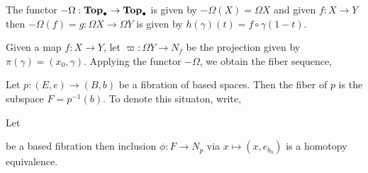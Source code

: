 \documentclass[12pt]{extarticle}
\begin{document}
\begin{definition}
The functor $-\Omega : \mathbf{Top}_{\bullet} \to \mathbf{Top}_{\bullet}$ is given by $-\Omega (X) = \Omega X$ and given $f : X \to Y$ then $- \Omega (f) = g : \Omega X \to \Omega Y$ is given by $h(\gamma)(t) = f \circ \gamma(1 - t)$.  
\end{definition}

\begin{definition}
Given a map $f : X \to Y$, let $\varpi : \Omega Y \to N_f$ be the projection given by $\pi(\gamma) = (x_0, \gamma)$. Applying the functor $-\Omega$, we obtain the fiber sequence,
\begin{center}
\end{center} 
\end{definition}

\begin{definition}
Let $p : (E, e) \to (B, b)$ be a fibration of based spaces. Then the fiber of $p$ is the subspace $F = p^{-1}(b)$. To denote this situaton, write,
\begin{center}
\end{center}
\end{definition}

\begin{lemma}
Let \begin{center}
\end{center}
be a based fibration then inclusion $\phi : F \to N_p$ via $x \mapsto (x, e_{b_0})$ is a homotopy equivalence.  
\end{lemma}
\end{document}
